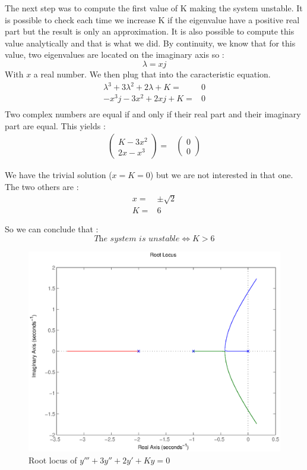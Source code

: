 The next step was to compute the first value of K making the system unstable. It is possible to check each time we increase K if the eigenvalue have a positive real part but the result is only an approximation. It is also possible to compute this value analytically and that is what we did. By continuity, we know that for this value, two eigenvalues are located on the imaginary axis so :
$$\lambda = xj$$
With $x$ a real number. We then plug that into the caracteristic equation.
\begin{eqnarray*}
\lambda ^3+3\lambda ^2+2\lambda +K=&0\\
-x^3j-3x^2+2xj+K=&0\\
\end{eqnarray*}
Two complex numbers are equal if and only if their real part and their imaginary part are equal. This yields :
\begin{eqnarray*}
\left(\begin{array}{c}
K-3x^2 \\ 
2x-x^3
\end{array} \right) =& \left( \begin{array}{c}
0 \\ 
0
\end{array} \right)
\end{eqnarray*}

We have the trivial solution ($x=K=0$) but we are not interested in that one. The two others are :
\begin{eqnarray*}
x =& \pm \sqrt{2}\\
K =& 6
\end{eqnarray*}

So we can conclude that :
$$\textit{The system is unstable} \iff K>6$$

\begin{figure}
\begin{center}
\includegraphics[scale=0.5]{rloc.eps}
\caption{Root locus of $y'''+3y''+2y'+Ky=0$}
\label{rloc}
\end{center}
\end{figure}

\FloatBarrier

